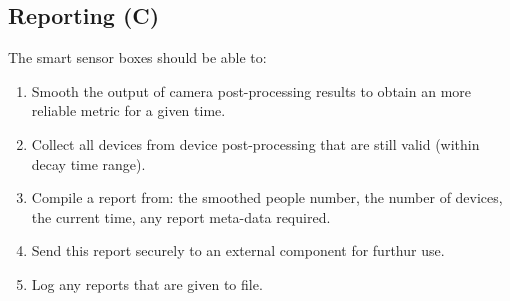 \documentclass{l4proj}
\begin{document}
\subsection{Reporting (C)}
The smart sensor boxes should be able to:
\begin{enumerate}
  \item Smooth the output of camera post-processing results to obtain an more reliable metric for a given time.
  \item Collect all devices from device post-processing that are still valid (within decay time range).
  \item Compile a report from: the smoothed people number, the number of devices, the current time, any report meta-data required.
  \item Send this report securely to an external component for furthur use.
  \item Log any reports that are given to file.
\end{enumerate}
\end{document}
